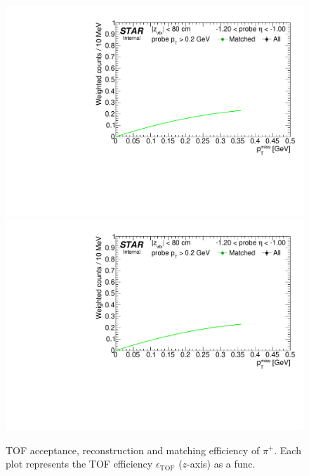 \begin{figure}%
\caption[TOF acceptance, reconstruction and matching efficiency of $\pi^{+}$.]{TOF acceptance, reconstruction and matching efficiency of $\pi^{+}$. Each plot represents the TOF efficiency $\epsilon_{\text{TOF}}$ ($z$-axis) as a func.}\label{fig:tagAndProbeTofEffFits_Eta}
\centering
\parbox{0.495\textwidth}{
  \centering
  \includegraphics[width=\linewidth,page=2]{graphics/systematicsEfficiency/TOF_tagAndProbe/Fitting_effVsEta_data.CPT.pdf}\\
  \includegraphics[width=\linewidth,page=3]{graphics/systematicsEfficiency/TOF_tagAndProbe/Fitting_effVsEta_data.CPT.pdf}\\
}
\end{figure}
